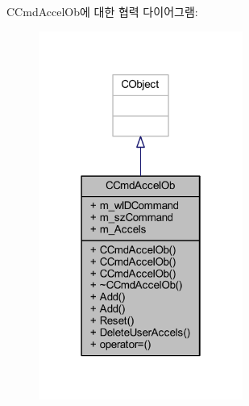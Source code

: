 C\+Cmd\+Accel\+Ob에 대한 협력 다이어그램\+:\nopagebreak
\begin{figure}[H]
\begin{center}
\leavevmode
\includegraphics[width=190pt]{class_c_cmd_accel_ob__coll__graph}
\end{center}
\end{figure}
